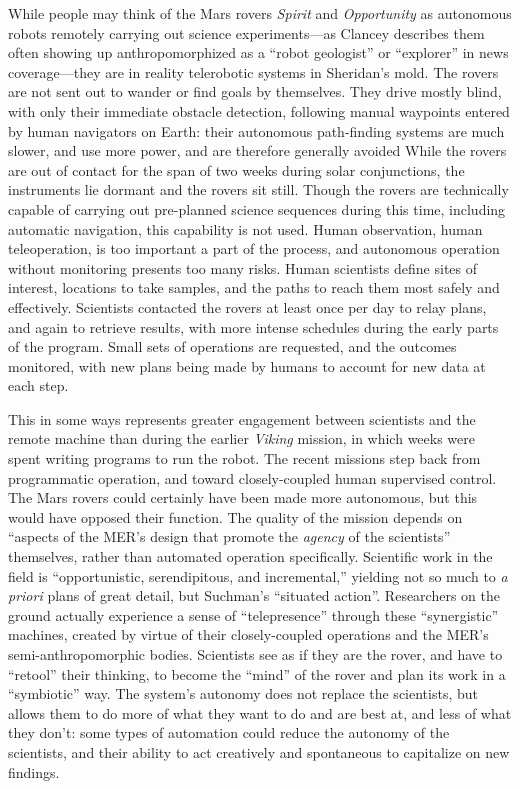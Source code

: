 While people may
think of the Mars rovers \emph{Spirit} and \emph{Opportunity} as
autonomous robots remotely carrying out science experiments---as
Clancey describes them often showing up anthropomorphized as a ``robot
geologist'' or 
``explorer'' in news coverage\cite[p. 7]{???-clancey}---they are
in reality telerobotic systems in Sheridan's mold. The rovers are not
sent out to wander or find goals by themselves. They drive mostly
blind, with only their immediate obstacle detection, following manual
waypoints entered by human navigators on Earth: their autonomous
path-finding systems are much slower, and use more power, and are
therefore generally avoided\cite[p. 118]{???-clancey} While the rovers
are out of contact for the span of two weeks during solar
conjunctions, the instruments lie dormant and the rovers sit
still\cite[p. 25]{???-clancey}. Though the rovers are technically capable of
carrying out pre-planned science sequences during this time, including
automatic navigation, this capability is not used. Human observation,
human teleoperation, is too important a part of the process, and
autonomous operation without monitoring presents too many risks. Human
scientists define sites of interest, locations to take samples, and
the paths to reach them most safely and effectively. Scientists
contacted the rovers at least once per day to relay plans, and again
to retrieve results, with more intense schedules during the early
parts of the program\cite[p. 58]{???-clancey}. Small sets of
operations are requested, and the outcomes monitored, with new plans
being made by humans to account for new data at each step.

This in some ways
represents greater engagement between scientists and the remote
machine than during the earlier \emph{Viking} mission, in which weeks
were spent writing programs to run the robot.\cite[p. 58]{???-clancey}
The recent missions step back
from programmatic operation, and toward closely-coupled human
supervised control. The Mars rovers could
certainly have been made more autonomous, but this would have opposed
their function. The quality of the mission depends on ``aspects of the
MER's design that promote the \emph{agency} of the scientists''
themselves, rather than automated operation specifically\cite[p.
  xii]{???-clancey}. Scientific work in the field is ``opportunistic,
serendipitous, and incremental,''\cite[p. 32]{???-clancey} yielding
not so much to \emph{a priori}
plans of great detail, but Suchman's ``situated
action''\cite{???-suchman}. Researchers on the ground actually
experience a sense of ``telepresence'' through these ``synergistic'' machines, created
by virtue of their closely-coupled operations and the MER's
semi-anthropomorphic bodies\cite[p. 55]{???-clancey}. Scientists see
as if they are the rover, and have to ``retool'' their thinking, to
become the ``mind'' of the rover and plan its work in a ``symbiotic''
way\cite[p. 106, 110, 118]{???-clancey}. The system's autonomy does not replace the
scientists, but allows them to do more of what they want to do and are
best at, and less of what they don't: some types of automation could reduce the
autonomy of the scientists, and their ability to act creatively and
spontaneous to capitalize on new findings\cite[p.
  118-119]{???-clancey}. 

